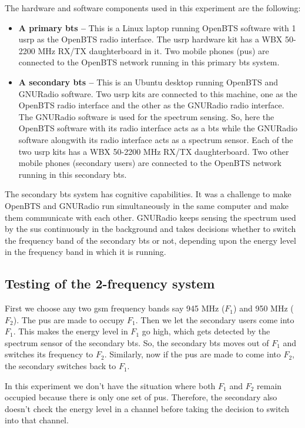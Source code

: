 The hardware and software components used in this experiment are the 
following:
\begin{itemize}
    \item \textbf{A primary \gls{bts} --} This is a Linux laptop running OpenBTS
    software with 1 \gls{usrp} as the OpenBTS radio interface. The \gls{usrp} hardware kit
    has a WBX 50-2200 MHz RX/TX daughterboard in it. Two mobile phones 
    (\glspl{pu}) are connected to the OpenBTS network running in this 
    primary \gls{bts} system.
    \item \textbf{A secondary \gls{bts} --} This is an Ubuntu desktop running
    OpenBTS and GNURadio software. Two \gls{usrp} kits are connected to this
    machine, one as the OpenBTS radio interface and the other as the GNURadio
    radio interface. The GNURadio software is used for the spectrum sensing. 
    So, here the OpenBTS software with its radio interface acts as a \gls{bts}
    while the GNURadio software alongwith its radio
    interface acts as a spectrum sensor. Each of the two \gls{usrp} kits has a
    WBX 50-2200 MHz RX/TX daughterboard. Two other mobile phones (secondary 
    users) are connected to the OpenBTS network running in this secondary \gls{bts}.
\end{itemize}

The secondary \gls{bts} system has cognitive capabilities. It was a challenge to 
make OpenBTS and GNURadio run simultaneously in the same computer and make 
them communicate with each other. GNURadio keeps sensing the spectrum used by
the \glspl{su} continuously in the background and takes decisions whether
to switch the frequency band of the secondary \gls{bts} or not, depending upon the 
energy level in the frequency band in which it is running.

\subsection{Testing of the 2-frequency system}
First we choose any two \gls{gsm} frequency bands say 945 MHz ($F_1$) and 950 MHz 
($F_2$). The \glspl{pu} are made to occupy $F_1$. Then we let the secondary
users come into $F_1$. This makes the energy level in $F_1$ go high, which 
gets detected by the spectrum sensor of the secondary \gls{bts}. So, the secondary 
\gls{bts} moves out of $F_1$ and switches its frequency to $F_2$. Similarly, now if 
the \glspl{pu} are made to come into $F_2$, the secondary switches back to 
$F_1$.

In this experiment we don't have the situation where both $F_1$ and $F_2$ 
remain occupied because there is only one set of \glspl{pu}. Therefore, the 
secondary also doesn't check the energy level in a channel before taking the
decision to switch into that channel.

